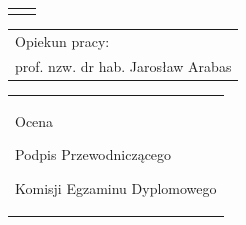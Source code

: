 \begin{titlepage}
{\begin{center}
	\vspace*{2\baselineskip}
	\hfill\mbox{}\par\vspace*{\baselineskip}\noindent
	\begin{tabular}[b]{@{}p{3cm}@{\ }l@{}}
	    {\large\hfill } & {\large }
	\end{tabular}
	\hfill
	\begin{tabular}[b]{@{}l@{}}
	Opiekun pracy: \\[\smallskipamount]
	{\large prof. nzw. dr hab. Jarosław Arabas}
	\end{tabular}\par
	\vspace*{2\baselineskip}
    \begin{tabular}{p{\textwidth}}
    \begin{flushleft}
	\begin{minipage}{7cm}
	Ocena \dotfill
	\par\vspace{1.6\baselineskip}
	\dotfill
	\par\noindent
	\centerline{\footnotesize Podpis Przewodniczącego} \par
	\centerline{\footnotesize Komisji Egzaminu Dyplomowego}\par
	\end{minipage}
    \end{flushleft}
    \end{tabular}
    \end{center}}


\end{titlepage}
